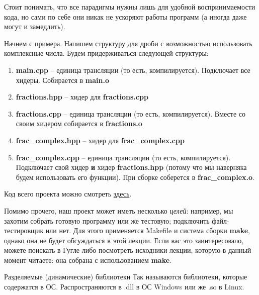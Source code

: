 \begin{lecture}[\lectureSubject]
\begin{lecSection}
		Стоит понимать, что все парадигмы нужны лишь для удобной воспринимаемости кода, но сами по себе они никак не ускоряют работы программ (а иногда даже могут и замедлить).
	\end{lecSection}
	\begin{lecSection}
		Начнем с примера. Напишем структуру для дроби с возможностью использовать комплексные числа.
		Будем придерживаться следующей структуры:
		\begin{enumerate}
			\item \textbf{main.cpp} -- единица трансляции (то есть, компилируется). Подключает все хидеры. Собирается в \textbf{main.o}
			\item \textbf{fractions.hpp} -- хидер для \textbf{fractions.cpp}
			\item \textbf{fractions.cpp} -- единица трансляции (то есть, компилируется). Вместе со своим хидером собирается в \textbf{fractions.o}
			\item \textbf{frac\_complex.hpp} -- хидер для \textbf{frac\_complex.cpp}
			\item \textbf{frac\_complex.cpp} -- единица трансляции (то есть, компилируется). Подключает свой хидер \textbf{и} хидер \textbf{fractions.hpp} (потому что мы наверняка будем использовать его функции). При сборке соберется в \textbf{frac\_complex.o}.
		\end{enumerate}
		\begin{center}
			{\large{Код всего проекта можно смотреть \href{https://github.com/alekseik1/cpp_lections_2017/tree/master/lection%208}{здесь}.
				}}
		\end{center}
				
		Помимо прочего, наш проект может иметь несколько \textit{целей}: например, мы захотим собрать готовую программу или же тестовую; подключить файл-тестировщик или нет. Для этого применяется Makefile и система сборки \textbf{make}, однако она не будет обсуждаться в этой лекции. Если вас это заинтересовало, можете поискать в Гугле либо посмотреть исходники лекции, которую в данный момент читаете: она  собрана с использованием \textbf{make}.
		
		\begin{lecSubsection}{Разделяемые (динамические) библиотеки}
			Так называются библиотеки, которые содержатся в ОС. Распространяются в .dll в  ОС Windows или же .so в Linux.
		\end{lecSubsection}
		

\end{lecSection}
\end{lecture}
